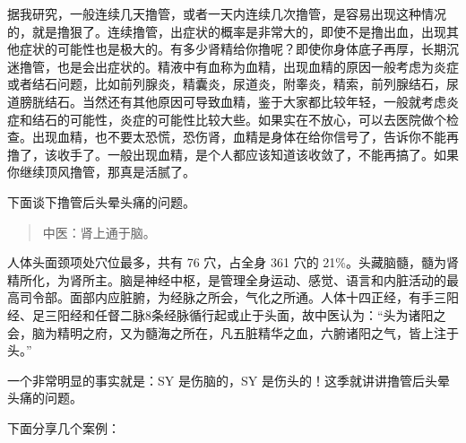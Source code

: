\documentclass[fontset=founder]{ctexart}
\begin{document}
据我研究，一般连续几天撸管，或者一天内连续几次撸管，是容易出现这种情况的，就是撸狠了。连续撸管，出症状的概率是非常大的，即使不是撸出血，出现其他症状的可能性也是极大的。有多少肾精给你撸呢？即使你身体底子再厚，长期沉迷撸管，也是会出症状的。精液中有血称为血精，出现血精的原因一般考虑为炎症或者结石问题，比如前列腺炎，精囊炎，尿道炎，附睾炎，精索，前列腺结石，尿道膀胱结石。当然还有其他原因可导致血精，鉴于大家都比较年轻，一般就考虑炎症和结石的可能性，炎症的可能性比较大些。如果实在不放心，可以去医院做个检查。出现血精，也不要太恐慌，恐伤肾，血精是身体在给你信号了，告诉你不能再撸了，该收手了。一般出现血精，是个人都应该知道该收敛了，不能再搞了。如果你继续顶风撸管，那真是活腻了。

下面谈下撸管后头晕头痛的问题。

\begin{quote}
    中医：肾上通于脑。
\end{quote}

人体头面颈项处穴位最多，共有 76 穴，占全身 361 穴的 21\%。头藏脑髓，髓为肾精所化，为肾所主。脑是神经中枢，是管理全身运动、感觉、语言和内脏活动的最高司令部。面部内应脏腑，为经脉之所会，气化之所通。人体十四正经，有手三阳经、足三阳经和任督二脉8条经脉循行起或止于头面，故中医认为：“头为诸阳之会，脑为精明之府，又为髓海之所在，凡五脏精华之血，六腑诸阳之气，皆上注于头。”

一个非常明显的事实就是：SY 是伤脑的，SY 是伤头的！这季就讲讲撸管后头晕头痛的问题。

下面分享几个案例：
\end{document}
